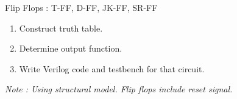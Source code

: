 \documentclass{vhdl-assignment}
\begin{document}
\begin{problem}{Flip Flops : T-FF, D-FF, JK-FF, SR-FF}
    \begin{enumerate}
        \item Construct truth table.
        \item Determine output function.
        \item Write Verilog code and testbench for that circuit.
    \end{enumerate}
\end{problem}

\textit{Note : Using structural model. Flip flops include reset signal.}
\end{document}
